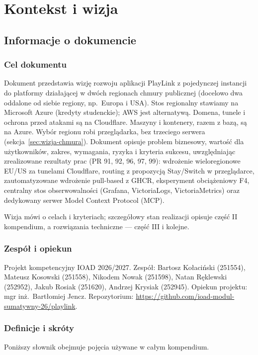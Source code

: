 
\chapter{Kontekst i wizja}
\label{ch:wizja}

\section{Informacje o dokumencie}

\subsection{Cel dokumentu}
Dokument przedstawia wizję rozwoju aplikacji PlayLink z pojedynczej instancji do
platformy działającej w dwóch regionach chmury publicznej (docelowo dwa oddalone od
siebie regiony, np.\ Europa i USA). Stos regionalny stawiamy na Microsoft Azure
(kredyty studenckie); AWS jest alternatywą. Domena, tunele i ochrona przed atakami są
na Cloudflare. Maszyny i kontenery, razem z bazą, są na Azure. Wybór regionu robi
przeglądarka, bez trzeciego serwera (sekcja~\ref{sec:wizja-chmura}). Dokument opisuje
problem biznesowy, wartość dla użytkowników, zakres, wymagania, ryzyka i kryteria
sukcesu, uwzględniając zrealizowane rezultaty prac (PR 91, 92, 96, 97, 99):
wdrożenie wieloregionowe EU/US za tunelami Cloudflare, routing z propozycją
Stay/Switch w przeglądarce, zautomatyzowane wdrożenie pull-based z GHCR, eksperyment
obciążeniowy F4, centralny stos obserwowalności (Grafana, VictoriaLogs,
VictoriaMetrics) oraz dedykowany serwer Model Context Protocol (MCP).

Wizja mówi o celach i kryteriach; szczegółowy stan realizacji opisuje część II
kompendium, a rozwiązania techniczne --- część III i kolejne.

\subsection{Zespół i opiekun}
Projekt kompetencyjny IOAD 2026/2027. Zespół: Bartosz Kołaciński (251554), Mateusz
Kosowski (251558), Nikodem Nowak (251598), Natan Ręklewski (252952), Jakub Rosiak
(251620), Andrzej Krysiak (252945). Opiekun projektu: mgr inż.\ Bartłomiej Jencz.
Repozytorium: \url{https://github.com/ioad-modul-sumatywny-26/playlink}.

\subsection{Definicje i skróty}
\label{sec:wizja-slownik}
Poniższy słownik obejmuje pojęcia używane w całym kompendium.

